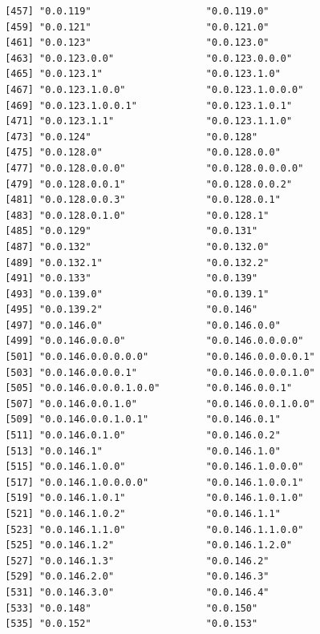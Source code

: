 \documentclass[
  letterpaper,
  DIV=11,
  numbers=noendperiod]{scrreprt}
\begin{document}
\begin{verbatim}
 [457] "0.0.119"                    "0.0.119.0"                 
 [459] "0.0.121"                    "0.0.121.0"                 
 [461] "0.0.123"                    "0.0.123.0"                 
 [463] "0.0.123.0.0"                "0.0.123.0.0.0"             
 [465] "0.0.123.1"                  "0.0.123.1.0"               
 [467] "0.0.123.1.0.0"              "0.0.123.1.0.0.0"           
 [469] "0.0.123.1.0.0.1"            "0.0.123.1.0.1"             
 [471] "0.0.123.1.1"                "0.0.123.1.1.0"             
 [473] "0.0.124"                    "0.0.128"                   
 [475] "0.0.128.0"                  "0.0.128.0.0"               
 [477] "0.0.128.0.0.0"              "0.0.128.0.0.0.0"           
 [479] "0.0.128.0.0.1"              "0.0.128.0.0.2"             
 [481] "0.0.128.0.0.3"              "0.0.128.0.1"               
 [483] "0.0.128.0.1.0"              "0.0.128.1"                 
 [485] "0.0.129"                    "0.0.131"                   
 [487] "0.0.132"                    "0.0.132.0"                 
 [489] "0.0.132.1"                  "0.0.132.2"                 
 [491] "0.0.133"                    "0.0.139"                   
 [493] "0.0.139.0"                  "0.0.139.1"                 
 [495] "0.0.139.2"                  "0.0.146"                   
 [497] "0.0.146.0"                  "0.0.146.0.0"               
 [499] "0.0.146.0.0.0"              "0.0.146.0.0.0.0"           
 [501] "0.0.146.0.0.0.0.0"          "0.0.146.0.0.0.0.1"         
 [503] "0.0.146.0.0.0.1"            "0.0.146.0.0.0.1.0"         
 [505] "0.0.146.0.0.0.1.0.0"        "0.0.146.0.0.1"             
 [507] "0.0.146.0.0.1.0"            "0.0.146.0.0.1.0.0"         
 [509] "0.0.146.0.0.1.0.1"          "0.0.146.0.1"               
 [511] "0.0.146.0.1.0"              "0.0.146.0.2"               
 [513] "0.0.146.1"                  "0.0.146.1.0"               
 [515] "0.0.146.1.0.0"              "0.0.146.1.0.0.0"           
 [517] "0.0.146.1.0.0.0.0"          "0.0.146.1.0.0.1"           
 [519] "0.0.146.1.0.1"              "0.0.146.1.0.1.0"           
 [521] "0.0.146.1.0.2"              "0.0.146.1.1"               
 [523] "0.0.146.1.1.0"              "0.0.146.1.1.0.0"           
 [525] "0.0.146.1.2"                "0.0.146.1.2.0"             
 [527] "0.0.146.1.3"                "0.0.146.2"                 
 [529] "0.0.146.2.0"                "0.0.146.3"                 
 [531] "0.0.146.3.0"                "0.0.146.4"                 
 [533] "0.0.148"                    "0.0.150"                   
 [535] "0.0.152"                    "0.0.153"                   

\end{verbatim}
\end{document}
